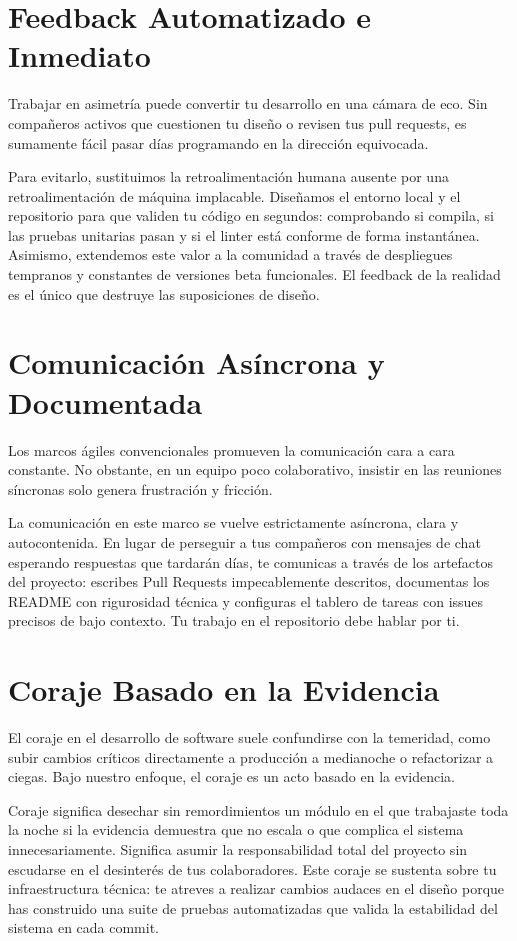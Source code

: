 \documentclass[14pt,a4paper,oneside]{extbook}
\begin{document}
\section{Feedback Automatizado e Inmediato}

Trabajar en asimetría puede convertir tu desarrollo en una cámara de eco. Sin compañeros activos que cuestionen tu diseño o revisen tus pull requests, es sumamente fácil pasar días programando en la dirección equivocada.

Para evitarlo, sustituimos la retroalimentación humana ausente por una retroalimentación de máquina implacable. Diseñamos el entorno local y el repositorio para que validen tu código en segundos: comprobando si compila, si las pruebas unitarias pasan y si el linter está conforme de forma instantánea. Asimismo, extendemos este valor a la comunidad a través de despliegues tempranos y constantes de versiones beta funcionales. El feedback de la realidad es el único que destruye las suposiciones de diseño.

\section{Comunicación Asíncrona y Documentada}

Los marcos ágiles convencionales promueven la comunicación cara a cara constante. No obstante, en un equipo poco colaborativo, insistir en las reuniones síncronas solo genera frustración y fricción.

La comunicación en este marco se vuelve estrictamente asíncrona, clara y autocontenida. En lugar de perseguir a tus compañeros con mensajes de chat esperando respuestas que tardarán días, te comunicas a través de los artefactos del proyecto: escribes Pull Requests impecablemente descritos, documentas los README con rigurosidad técnica y configuras el tablero de tareas con issues precisos de bajo contexto. Tu trabajo en el repositorio debe hablar por ti.

\section{Coraje Basado en la Evidencia}

El coraje en el desarrollo de software suele confundirse con la temeridad, como subir cambios críticos directamente a producción a medianoche o refactorizar a ciegas. Bajo nuestro enfoque, el coraje es un acto basado en la evidencia.

Coraje significa desechar sin remordimientos un módulo en el que trabajaste toda la noche si la evidencia demuestra que no escala o que complica el sistema innecesariamente. Significa asumir la responsabilidad total del proyecto sin escudarse en el desinterés de tus colaboradores. Este coraje se sustenta sobre tu infraestructura técnica: te atreves a realizar cambios audaces en el diseño porque has construido una suite de pruebas automatizadas que valida la estabilidad del sistema en cada commit.
\end{document}
